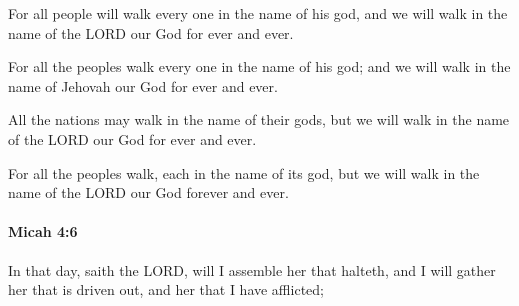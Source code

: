 			For all people will walk every one in the name of his god, and we will walk in the name of the LORD our God for ever and ever.

			\begin{versebox}
					\item[BHS] 
					\item[LXX] 
					\item[ASV] For all the peoples walk every one in the name of his god; and we will walk in the name of Jehovah our God for ever and ever.
					\item[NIV] All the nations may walk in the name of their gods, but we will walk in the name of the LORD our God for ever and ever.
					\item[NRSV] For all the peoples walk, each in the name of its god, but we will walk in the name of the LORD our God forever and ever.
			\end{versebox}

		\paragraph{Micah 4:6} %
			\label{MICAH-4-6}

			In that day, saith the LORD, will I assemble her that halteth, and I will gather her that is driven out, and her that I have afflicted;

